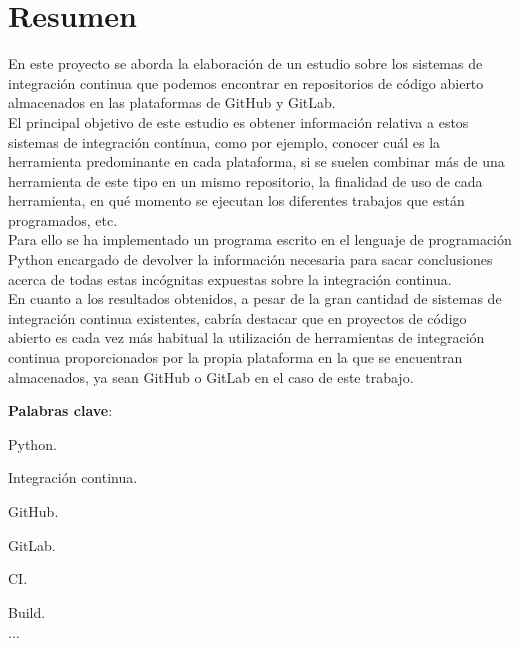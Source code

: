 \documentclass[12pt,twoside,titlepage]{report}
\newcommand\blankpage{%
    \newpage
    \null
    \thispagestyle{empty}%
    \newpage}
\begin{document}
\afterpage{\blankpage}








\chapter*{Resumen}

En este proyecto se aborda la elaboración de un estudio sobre los sistemas de integración continua que podemos encontrar en repositorios de código abierto almacenados en las plataformas de GitHub y GitLab.\\
El principal objetivo de este estudio es obtener información relativa a estos sistemas de integración contínua, como por ejemplo, conocer cuál es la herramienta predominante en cada plataforma, si se suelen combinar más de una herramienta de este tipo en un mismo repositorio, la finalidad de uso de cada herramienta, en qué momento se ejecutan los diferentes trabajos que están programados, etc.\\
Para ello se ha implementado un programa escrito en el lenguaje de programación Python encargado de devolver la información necesaria para sacar conclusiones acerca de todas estas incógnitas expuestas sobre la integración continua.\\
En cuanto a los resultados obtenidos, a pesar de la gran cantidad de sistemas de integración continua existentes, cabría destacar que en proyectos de código abierto es cada vez más habitual la utilización de herramientas de integración continua proporcionados por la propia plataforma en la que se encuentran almacenados, ya sean GitHub o GitLab en el caso de este trabajo.
\mbox{} \bigskip

\noindent \textbf{Palabras clave}:
\begin{compactitem}
    \item Python.
    \item Integración continua.
    \item GitHub.
    \item GitLab.
    \item CI.
    \item Build.
    \item $\ldots$
\end{compactitem}
\end{document}

